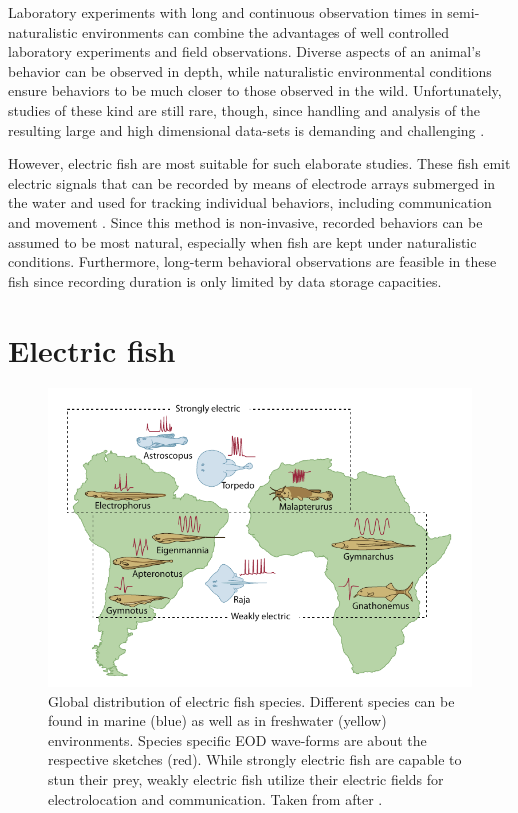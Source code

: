 \documentclass[11pt,pdftex]{article}
\begin{document}
Laboratory experiments with long and continuous observation times in semi-naturalistic environments can combine the advantages of well controlled laboratory experiments and field observations. Diverse aspects of an animal's behavior can be observed in depth, while naturalistic environmental conditions ensure behaviors to be much closer to those observed in the wild. Unfortunately, studies of these kind are still rare, though, since handling and analysis of the resulting large and high dimensional data-sets is demanding and challenging \citep{Gomez2014}.

However, electric fish are most suitable for such elaborate studies. These fish emit electric signals that can be recorded by means of electrode arrays submerged in the water and used for tracking individual behaviors, including communication \citep{Smith2013} and movement \citep{Madhav2018, Henninger2020}. Since this method is non-invasive, recorded behaviors can be assumed to be most natural, especially when fish are kept under naturalistic conditions. Furthermore, long-term behavioral observations are feasible in these fish since recording duration is only limited by data storage capacities.

\section{Electric fish}

\begin{figure}[h!]
  \centerline{\includegraphics[width=.8\textwidth]{distribution_efish}}
  \caption{\label{efish_dist} Global distribution of electric fish species. Different species can be found in marine (blue) as well as in freshwater (yellow) environments. Species specific EOD wave-forms are about the respective sketches (red). While strongly electric fish are capable to stun their prey, weakly electric fish utilize their electric fields for electrolocation and communication. Taken from \citet{Nelson2011} after \citet{Moller1995}.}
\end{figure}
\end{document}
